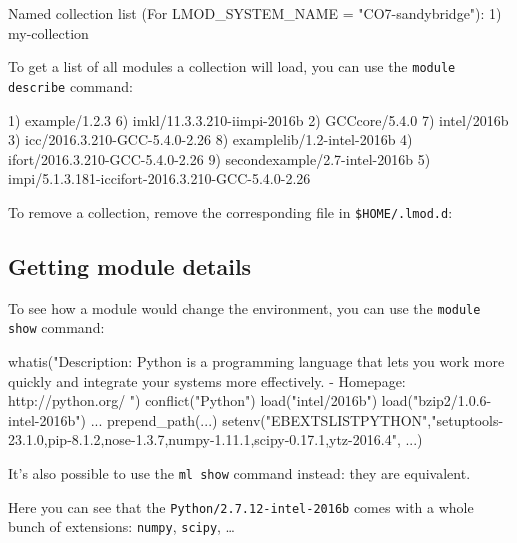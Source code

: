 \begin{prompt}
Named collection list (For LMOD_SYSTEM_NAME = "CO7-sandybridge"):
  1) my-collection
\end{prompt}

To get a list of all modules a collection will load, you can use the \lstinline|module describe|
command:
\begin{prompt}
1) example/1.2.3                                          6) imkl/11.3.3.210-iimpi-2016b
2) GCCcore/5.4.0                                          7) intel/2016b
3) icc/2016.3.210-GCC-5.4.0-2.26                          8) examplelib/1.2-intel-2016b
4) ifort/2016.3.210-GCC-5.4.0-2.26                        9) secondexample/2.7-intel-2016b
5) impi/5.1.3.181-iccifort-2016.3.210-GCC-5.4.0-2.26
\end{prompt}
\fi

To remove a collection, remove the corresponding file in \lstinline|$HOME/.lmod.d|:

\begin{prompt}
\end{prompt}

\subsection{Getting module details}

To see how a module would change the environment, you can use the \lstinline|module show| command:

\ifusinglmod

\begin{prompt}
whatis("Description: Python is a programming language that lets you work more quickly and integrate your systems  more effectively. - Homepage: http://python.org/ ")
conflict("Python")
load("intel/2016b")
load("bzip2/1.0.6-intel-2016b")
...
prepend_path(...)
setenv("EBEXTSLISTPYTHON","setuptools-23.1.0,pip-8.1.2,nose-1.3.7,numpy-1.11.1,scipy-0.17.1,ytz-2016.4", ...)
\end{prompt}


It's also possible to use the \lstinline|ml show| command instead: they are equivalent.

Here you can see that the \lstinline|Python/2.7.12-intel-2016b| comes with a whole
bunch of extensions: \lstinline|numpy|, \lstinline|scipy|, \ldots

